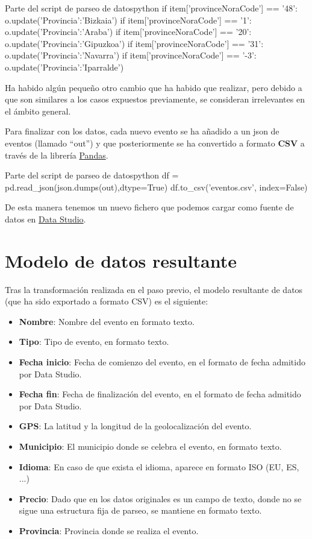 \documentclass{\ClassPath/viu-tfm-template}
\begin{document}
\begin{mycode}{Parte del script de parseo de datos}{python}{}
if item['provinceNoraCode'] == '48':
    o.update({'Provincia':'Bizkaia'})
if item['provinceNoraCode'] == '1':
    o.update({'Provincia':'Araba'})
if item['provinceNoraCode'] == '20':
    o.update({'Provincia':'Gipuzkoa'})
if item['provinceNoraCode'] == '31':
    o.update({'Provincia':'Navarra'})
if item['provinceNoraCode'] == '-3':
    o.update({'Provincia':'Iparralde'})
\end{mycode}


Ha habido algún pequeño otro cambio que ha habido que realizar, pero debido a que son similares a los casos expuestos previamente, se consideran irrelevantes en el ámbito general.

Para finalizar con los datos, cada nuevo evento se ha añadido a un json de eventos (llamado “out”) y que posteriormente se ha convertido a formato \textbf{CSV} a través de la librería \href{https://pandas.pydata.org/}{Pandas}.

\begin{mycode}{Parte del script de parseo de datos}{python}{}
df = pd.read_json(json.dumps(out),dtype=True)
df.to_csv('eventos.csv', index=False)
\end{mycode}

De esta manera tenemos un nuevo fichero  que podemos cargar como fuente de datos en \href{https://datastudio.google.com/}{Data Studio}.

\section{Modelo de datos resultante}

Tras la transformación realizada en el paso previo, el modelo resultante de datos (que ha sido exportado a formato CSV) es el siguiente:

\begin{itemize}
    \item \textbf{Nombre}: Nombre del evento en formato texto.
    \item \textbf{Tipo}: Tipo de evento, en formato texto.
    \item \textbf{Fecha inicio}: Fecha de comienzo del evento, en el formato de fecha admitido por Data Studio.
    \item \textbf{Fecha fin}: Fecha de finalización del evento, en el formato de fecha admitido por Data Studio.
    \item \textbf{GPS}: La latitud y la longitud de la geolocalización del evento.
    \item \textbf{Municipio}: El municipio donde se celebra el evento, en formato texto.
    \item \textbf{Idioma}: En caso de que exista el idioma, aparece en formato ISO (EU, ES, ...)
    \item \textbf{Precio}: Dado que en los datos originales es un campo de texto, donde no se sigue una estructura fija de parseo, se mantiene en formato texto.
    \item \textbf{Provincia}: Provincia donde se realiza el evento.
\end{itemize}
\end{document}
